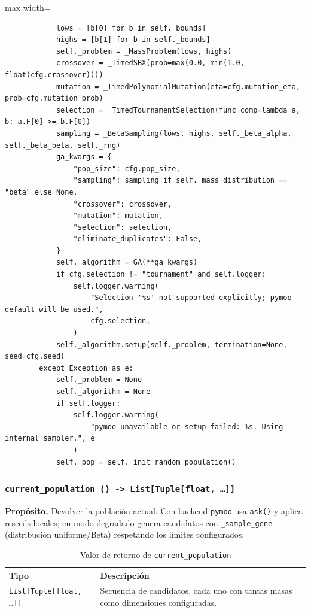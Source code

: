 \begin{listing}[H]
\begin{adjustbox}{max width=\textwidth}
\begin{minipage}{0.85\textwidth}
\begin{verbatim}
            lows = [b[0] for b in self._bounds]
            highs = [b[1] for b in self._bounds]
            self._problem = _MassProblem(lows, highs)
            crossover = _TimedSBX(prob=max(0.0, min(1.0, float(cfg.crossover))))
            mutation = _TimedPolynomialMutation(eta=cfg.mutation_eta, prob=cfg.mutation_prob)
            selection = _TimedTournamentSelection(func_comp=lambda a, b: a.F[0] >= b.F[0])
            sampling = _BetaSampling(lows, highs, self._beta_alpha, self._beta_beta, self._rng)
            ga_kwargs = {
                "pop_size": cfg.pop_size,
                "sampling": sampling if self._mass_distribution == "beta" else None,
                "crossover": crossover,
                "mutation": mutation,
                "selection": selection,
                "eliminate_duplicates": False,
            }
            self._algorithm = GA(**ga_kwargs)
            if cfg.selection != "tournament" and self.logger:
                self.logger.warning(
                    "Selection '%s' not supported explicitly; pymoo default will be used.",
                    cfg.selection,
                )
            self._algorithm.setup(self._problem, termination=None, seed=cfg.seed)
        except Exception as e:
            self._problem = None
            self._algorithm = None
            if self.logger:
                self.logger.warning(
                    "pymoo unavailable or setup failed: %s. Using internal sampler.", e
                )
            self._pop = self._init_random_population()
\end{verbatim}
\end{minipage}
\end{adjustbox}
\end{listing}

\subsubsection*{\texttt{current\_population~() -> List[Tuple[float, \dots]]}}
\textbf{Propósito.} Devolver la población actual. Con backend \texttt{pymoo} usa \texttt{ask()} y aplica reseeds locales; en modo degradado genera candidatos con \texttt{\_sample\_gene} (distribución uniforme/Beta) respetando los límites configurados.

\begin{table}[H]
  \centering
  \caption{Valor de retorno de \texttt{current\_population}}
  \small
  \begin{tabularx}{\textwidth}{@{}p{}X@{}}
    \toprule
    \textbf{Tipo} & \textbf{Descripción} \\
    \midrule
    \texttt{List[Tuple[float, \dots]]} & Secuencia de candidatos, cada uno con tantas masas como dimensiones configuradas. \\
    \bottomrule
  \end{tabularx}
\end{table}


